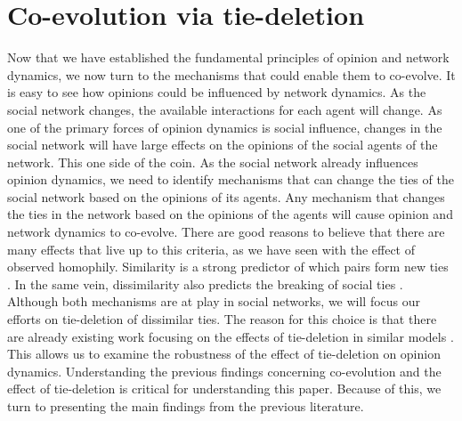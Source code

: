 \documentclass{article}
\begin{document}
\section{Co-evolution via tie-deletion}
Now that we have established the fundamental principles of opinion and network dynamics, we now turn to the mechanisms that could enable them to co-evolve. 
It is easy to see how opinions could be influenced by network dynamics. 
As the social network changes, the available interactions for each agent will change. 
As one of the primary forces of opinion dynamics is social influence, changes in the social network will have large effects on the opinions of the social agents of the network. 
This one side of the coin. As the social network already influences opinion dynamics, we need to identify mechanisms that can change the ties of the social network based on the opinions of its agents. 
Any mechanism that changes the ties in the network based on the opinions of the agents will cause opinion and network dynamics to co-evolve. 
There are good reasons to believe that there are many effects that live up to this criteria, as we have seen with the effect of observed homophily. 
Similarity is a strong predictor of which pairs form new ties \cite{bener_empirical_2016,kossinets_origins_2009}.
In the same vein, dissimilarity also predicts the breaking of social ties \cite{bener_empirical_2016,kossinets_origins_2009,levin_dynamics_2021}. 
Although both mechanisms are at play in social networks, we will focus our efforts on tie-deletion of dissimilar ties. 
The reason for this choice is that there are already existing work focusing on the effects of tie-deletion in similar models \cite{santos_cooperation_2006,sasahara_social_2021}. 
This allows us to examine the robustness of the effect of tie-deletion on opinion dynamics. 
Understanding the previous findings concerning co-evolution and the effect of tie-deletion is critical for understanding this paper. Because of this, we turn to presenting the main findings from the previous literature. 
\end{document}
